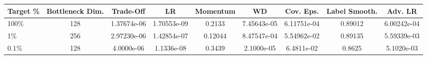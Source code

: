 \begin{tabular}{l | c c c c c c c c}
\toprule
Target \% & Bottleneck Dim. & Trade-Off & LR & Momentum & WD & Cov. Eps. & Label Smooth. & Adv. LR \\
\midrule
100\% & 128 & 1.37674e-06 & 1.70553e-09 & 0.2133 & 7.45643e-05 & 6.11751e-04 & 0.89012 & 6.00242e-04 \\
1\% & 256& 2.97230e-06 & 1.42854e-07 & 0.12044 & 8.47547e-04 & 5.54962e-02 & 0.89135 & 5.59339e-03 \\
0.1\% & 128 & 4.0000e-06 & 1.1336e-08 & 0.3439 & 2.1000e-05 & 6.4811e-02 & 0.8625 & 5.1020e-03 \\
\bottomrule
\end{tabular}

